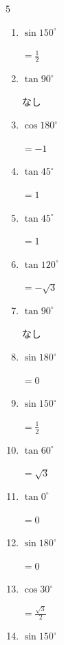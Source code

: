 \begin{multicols}{5}
\begin{enumerate}
  \item $\displaystyle \sin{150^\circ}$

        $\displaystyle =\frac{1}{2}$

  \item $\displaystyle \tan{90^\circ}$

        $\displaystyle なし$

\columnbreak %

  \item $\displaystyle \cos{180^\circ}$

        $\displaystyle =-1$

  \item $\displaystyle \tan{45^\circ}$

        $\displaystyle =1$

  \item $\displaystyle \tan{45^\circ}$

        $\displaystyle =1$

  \item $\displaystyle \tan{120^\circ}$

        $\displaystyle =-\sqrt{3}$

  \item $\displaystyle \tan{90^\circ}$

        $\displaystyle なし$

  \item $\displaystyle \sin{180^\circ}$

        $\displaystyle =0$

  \item $\displaystyle \sin{150^\circ}$

        $\displaystyle =\frac{1}{2}$

  \item $\displaystyle \tan{60^\circ}$

        $\displaystyle =\sqrt{3}$

  \item $\displaystyle \tan{0^\circ}$

        $\displaystyle =0$

  \item $\displaystyle \sin{180^\circ}$

        $\displaystyle =0$

  \item $\displaystyle \cos{30^\circ}$

        $\displaystyle =\frac{\sqrt{3}}{2}$

  \item $\displaystyle \sin{150^\circ}$


\end{enumerate}
\end{multicols}
